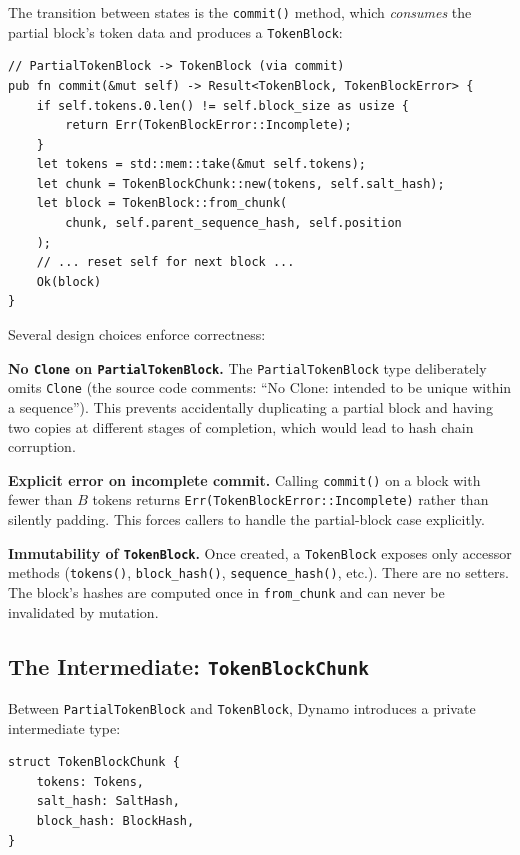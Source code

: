 The transition between states is the \texttt{commit()} method, which \emph{consumes} the partial block's token data and produces a \texttt{TokenBlock}:

\begin{verbatim}
// PartialTokenBlock -> TokenBlock (via commit)
pub fn commit(&mut self) -> Result<TokenBlock, TokenBlockError> {
    if self.tokens.0.len() != self.block_size as usize {
        return Err(TokenBlockError::Incomplete);
    }
    let tokens = std::mem::take(&mut self.tokens);
    let chunk = TokenBlockChunk::new(tokens, self.salt_hash);
    let block = TokenBlock::from_chunk(
        chunk, self.parent_sequence_hash, self.position
    );
    // ... reset self for next block ...
    Ok(block)
}
\end{verbatim}

Several design choices enforce correctness:

\textbf{No \texttt{Clone} on \texttt{PartialTokenBlock}.}\hspace{1em} The \texttt{PartialTokenBlock} type deliberately omits \texttt{Clone} (the source code comments: ``No Clone: intended to be unique within a sequence''). This prevents accidentally duplicating a partial block and having two copies at different stages of completion, which would lead to hash chain corruption.

\textbf{Explicit error on incomplete commit.}\hspace{1em} Calling \texttt{commit()} on a block with fewer than $B$ tokens returns \texttt{Err(TokenBlockError::Incomplete)} rather than silently padding. This forces callers to handle the partial-block case explicitly.

\textbf{Immutability of \texttt{TokenBlock}.}\hspace{1em} Once created, a \texttt{TokenBlock} exposes only accessor methods (\texttt{tokens()}, \texttt{block\_hash()}, \texttt{sequence\_hash()}, etc.). There are no setters. The block's hashes are computed once in \texttt{from\_chunk} and can never be invalidated by mutation.

\subsection{The Intermediate: \texttt{TokenBlockChunk}}

Between \texttt{PartialTokenBlock} and \texttt{TokenBlock}, Dynamo introduces a private intermediate type:

\begin{verbatim}
struct TokenBlockChunk {
    tokens: Tokens,
    salt_hash: SaltHash,
    block_hash: BlockHash,
}
\end{verbatim}


